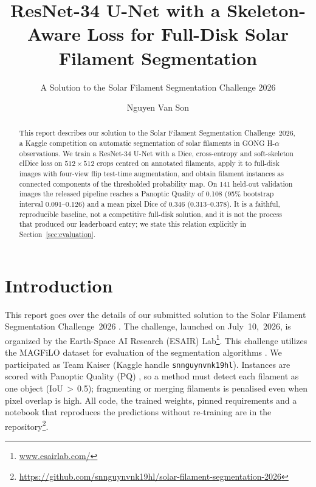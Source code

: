 \documentclass[sigconf]{acmart}
\begin{document}
\title{ResNet-34 U-Net with a Skeleton-Aware Loss for Full-Disk Solar Filament Segmentation}
\subtitle{A Solution to the Solar Filament Segmentation Challenge 2026} %

\author{Nguyen Van Son}

\begin{abstract}
    This report describes our solution to the Solar Filament Segmentation Challenge~2026, a Kaggle competition on automatic segmentation of solar filaments in GONG H-$\alpha$ observations. We train a ResNet-34 U-Net with a Dice, cross-entropy and soft-skeleton clDice loss on $512\times512$ crops centred on annotated filaments, apply it to full-disk images with four-view flip test-time augmentation, and obtain filament instances as connected components of the thresholded probability map. On 141 held-out validation images the released pipeline reaches a Panoptic Quality of 0.108 (95\% bootstrap interval 0.091--0.126) and a mean pixel Dice of 0.346 (0.313--0.378). It is a faithful, reproducible baseline, not a competitive full-disk solution, and it is not the process that produced our leaderboard entry; we state this relation explicitly in Section~\ref{sec:evaluation}.
\end{abstract}

\maketitle

\section{Introduction}
    This report goes over the details of our submitted solution to the Solar Filament Segmentation Challenge~2026 \cite{filament-segmentation-2026}. The challenge, launched on July~10,~2026, is organized by the Earth-Space AI Research (ESAIR) Lab\footnote{\href{https://www.esairlab.com/home}{www.esairlab.com/}}. This challenge utilizes the MAGFiLO dataset for evaluation of the segmentation algorithms \cite{ahmadzadeh2024dataset}. We participated as Team Kaiser (Kaggle handle \texttt{snnguynvnk19hl}). Instances are scored with Panoptic Quality (PQ) \cite{kirillov2019panoptic}, so a method must detect each filament as one object (IoU\,$>$\,0.5); fragmenting or merging filaments is penalised even when pixel overlap is high. All code, the trained weights, pinned requirements and a notebook that reproduces the predictions without re-training are in the repository\footnote{\url{https://github.com/snnguynvnk19hl/solar-filament-segmentation-2026}}.
\end{document}
